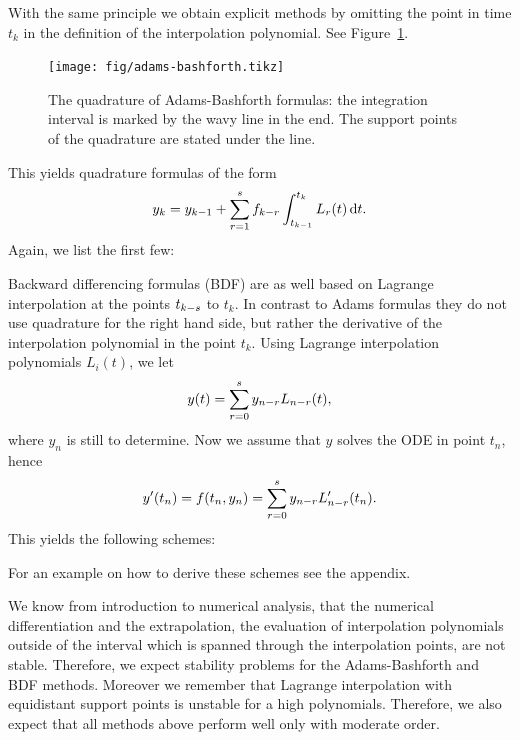 \begin{example}
  \label{ex:lmm:1}
   With the same principle we obtain
  explicit methods by omitting the point in time $t_k$ in the
  definition of the interpolation polynomial. See
  Figure~\ref{fig:lmm:adams-bashforth}.
  \begin{figure}[tbp]
    \begin{center}
      \texttt{[image: fig/adams-bashforth.tikz]}
    \end{center}
    \caption{The quadrature of Adams-Bashforth formulas: the
      integration interval is marked by the wavy line in the end. The support 
			points of the quadrature are stated under the line.}
    \label{fig:lmm:adams-bashforth}
  \end{figure}
  This yields quadrature formulas of the form
  \begin{gather}
    \label{eq:lmm:17}
    y_k = y_{k-1} + \sum_{r=1}^s f_{k-r} \int_{t_{k-1}}^{t_k}
    L_r(t) \,\mathrm{d} t.
  \end{gather}
  Again, we list the first few:
  
\end{example}

\begin{example}
  \label{ex:lmm:3}
   Backward differencing formulas (BDF) are as well
  based on Lagrange interpolation at the points $t_{k-s}$ to
  $t_k$. In contrast to Adams formulas they do not use quadrature for
  the right hand side, but rather the derivative of the interpolation
  polynomial in the point $t_k$.  Using Lagrange interpolation
  polynomials $L_i(t)$, we let
  \begin{gather*}
    y(t) = \sum_{r=0}^s y_{n-r} L_{n-r}(t),
  \end{gather*}
  where $y_n$ is still to determine. Now we assume that $y$ solves the ODE
  in point $t_n$, hence
  \begin{gather*}
    y'(t_n) = f(t_n, y_n) = \sum_{r=0}^s y_{n-r} L'_{n-r}(t_n).
  \end{gather*}
  This yields the following schemes:
  
  For an example on how to derive these schemes see the appendix.
\end{example}

\begin{remark}
  We know from introduction to numerical analysis, that the numerical
  differentiation and the extrapolation, the evaluation of
  interpolation polynomials outside of the interval which is spanned
  through the interpolation points, are not stable.  Therefore, we
  expect stability problems for the Adams-Bashforth and BDF
  methods. Moreover we remember that Lagrange interpolation with
  equidistant support points is unstable for a high
  polynomials. Therefore, we also expect that all methods above
  perform well only with moderate order.
\end{remark}

